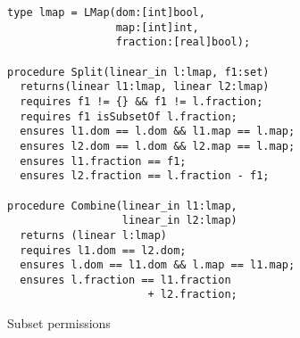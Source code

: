 \begin{figure}
\begin{verbatim}
type lmap = LMap(dom:[int]bool,
                 map:[int]int,
                 fraction:[real]bool);

procedure Split(linear_in l:lmap, f1:set)
  returns(linear l1:lmap, linear l2:lmap)
  requires f1 != {} && f1 != l.fraction;
  requires f1 isSubsetOf l.fraction;
  ensures l1.dom == l.dom && l1.map == l.map;
  ensures l2.dom == l.dom && l2.map == l.map;
  ensures l1.fraction == f1;
  ensures l2.fraction == l.fraction - f1;

procedure Combine(linear_in l1:lmap,
                  linear_in l2:lmap)
  returns (linear l:lmap)
  requires l1.dom == l2.dom;
  ensures l.dom == l1.dom && l.map == l1.map;
  ensures l.fraction == l1.fraction
                      + l2.fraction;
\end{verbatim}
\caption{Subset permissions}
\label{fig:subperm}
\end{figure}
